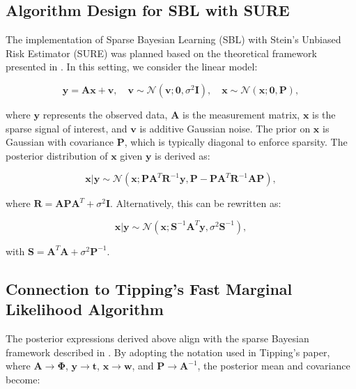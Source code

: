 \documentclass{article}
\begin{document}
\subsection{Algorithm Design for SBL with SURE}
The implementation of Sparse Bayesian Learning (SBL) with Stein's Unbiased Risk Estimator (SURE) was planned based on the theoretical framework presented in \cite{slockSURE}. In this setting, we consider the linear model:

\begin{equation}
    \mathbf{y} = \mathbf{A}\mathbf{x} + \mathbf{v}, \quad \mathbf{v} \sim \mathcal{N}(\mathbf{v}; \mathbf{0}, \sigma^2 \mathbf{I}), \quad \mathbf{x} \sim \mathcal{N}(\mathbf{x}; \mathbf{0}, \mathbf{P}),
\end{equation}

where $\mathbf{y}$ represents the observed data, $\mathbf{A}$ is the measurement matrix, $\mathbf{x}$ is the sparse signal of interest, and $\mathbf{v}$ is additive Gaussian noise. The prior on $\mathbf{x}$ is Gaussian with covariance $\mathbf{P}$, which is typically diagonal to enforce sparsity. The posterior distribution of $\mathbf{x}$ given $\mathbf{y}$ is derived as:

\begin{equation}
    \mathbf{x}|\mathbf{y} \sim \mathcal{N}\left(\mathbf{x}; \mathbf{P}\mathbf{A}^T\mathbf{R}^{-1}\mathbf{y}, \mathbf{P} - \mathbf{P}\mathbf{A}^T\mathbf{R}^{-1}\mathbf{A}\mathbf{P}\right),
\end{equation}

where $\mathbf{R} = \mathbf{A}\mathbf{P}\mathbf{A}^T + \sigma^2 \mathbf{I}$. Alternatively, this can be rewritten as:

\begin{equation}
    \mathbf{x}|\mathbf{y} \sim \mathcal{N}\left(\mathbf{x}; \mathbf{S}^{-1}\mathbf{A}^T\mathbf{y}, \sigma^2 \mathbf{S}^{-1}\right),
\end{equation}

with $\mathbf{S} = \mathbf{A}^T\mathbf{A} + \sigma^2 \mathbf{P}^{-1}$. 

\subsection{Connection to Tipping's Fast Marginal Likelihood Algorithm}
The posterior expressions derived above align with the sparse Bayesian framework described in \cite{tipp2003fastsb}. By adopting the notation used in Tipping's paper, where $\mathbf{A} \rightarrow \boldsymbol{\Phi}$, $\mathbf{y} \rightarrow \mathbf{t}$, $\mathbf{x} \rightarrow \mathbf{w}$, and $\mathbf{P} \rightarrow \mathbf{A}^{-1}$, the posterior mean and covariance become:
\end{document}
